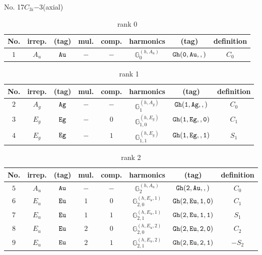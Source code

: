 \documentclass[fleqn,8pt]{jsarticle}
\begin{document}
\setcounter{MaxMatrixCols}{16}

\begin{center}
\LARGE
No. 17\quad$C_{3i}$\quad$-3$\quad[ trigonal ] (axial)
\end{center}
\begin{table}[ht!]
\begin{center}
\caption{rank 0}
\renewcommand{\arraystretch}{1.3}
\begin{tabular}{cccccccc} \hline \hline
No. & irrep. & (tag) & mul. & comp. & harmonics & (tag) & definition \\ \hline
$ 1 $ & $ A_{u} $ & $ {\tt Au} $ & $ - $ & $ - $ & $ \mathbb{G}_{0}^{(h,A_{u})} $ & $ {\tt Gh(0,Au,,)} $ & $ C_{0} $ \\
 \hline \hline
\end{tabular}
\end{center}
\end{table}
\begin{table}[ht!]
\begin{center}
\caption{rank 1}
\renewcommand{\arraystretch}{1.3}
\begin{tabular}{cccccccc} \hline \hline
No. & irrep. & (tag) & mul. & comp. & harmonics & (tag) & definition \\ \hline
$ 2 $ & $ A_{g} $ & $ {\tt Ag} $ & $ - $ & $ - $ & $ \mathbb{G}_{1}^{(h,A_{g})} $ & $ {\tt Gh(1,Ag,,)} $ & $ C_{0} $ \\
$ 3 $ & $ E_{g} $ & $ {\tt Eg} $ & $ - $ & $ 0 $ & $ \mathbb{G}_{1,0}^{(h,E_{g})} $ & $ {\tt Gh(1,Eg,,0)} $ & $ C_{1} $ \\
$ 4 $ & $ E_{g} $ & $ {\tt Eg} $ & $ - $ & $ 1 $ & $ \mathbb{G}_{1,1}^{(h,E_{g})} $ & $ {\tt Gh(1,Eg,,1)} $ & $ S_{1} $ \\
 \hline \hline
\end{tabular}
\end{center}
\end{table}
\begin{table}[ht!]
\begin{center}
\caption{rank 2}
\renewcommand{\arraystretch}{1.3}
\begin{tabular}{cccccccc} \hline \hline
No. & irrep. & (tag) & mul. & comp. & harmonics & (tag) & definition \\ \hline
$ 5 $ & $ A_{u} $ & $ {\tt Au} $ & $ - $ & $ - $ & $ \mathbb{G}_{2}^{(h,A_{u})} $ & $ {\tt Gh(2,Au,,)} $ & $ C_{0} $ \\
$ 6 $ & $ E_{u} $ & $ {\tt Eu} $ & $ 1 $ & $ 0 $ & $ \mathbb{G}_{2,0}^{(h,E_{u},1)} $ & $ {\tt Gh(2,Eu,1,0)} $ & $ C_{1} $ \\
$ 7 $ & $ E_{u} $ & $ {\tt Eu} $ & $ 1 $ & $ 1 $ & $ \mathbb{G}_{2,1}^{(h,E_{u},1)} $ & $ {\tt Gh(2,Eu,1,1)} $ & $ S_{1} $ \\
$ 8 $ & $ E_{u} $ & $ {\tt Eu} $ & $ 2 $ & $ 0 $ & $ \mathbb{G}_{2,0}^{(h,E_{u},2)} $ & $ {\tt Gh(2,Eu,2,0)} $ & $ C_{2} $ \\
$ 9 $ & $ E_{u} $ & $ {\tt Eu} $ & $ 2 $ & $ 1 $ & $ \mathbb{G}_{2,1}^{(h,E_{u},2)} $ & $ {\tt Gh(2,Eu,2,1)} $ & $ - S_{2} $ \\
 \hline \hline
\end{tabular}
\end{center}
\end{table}
\end{document}
